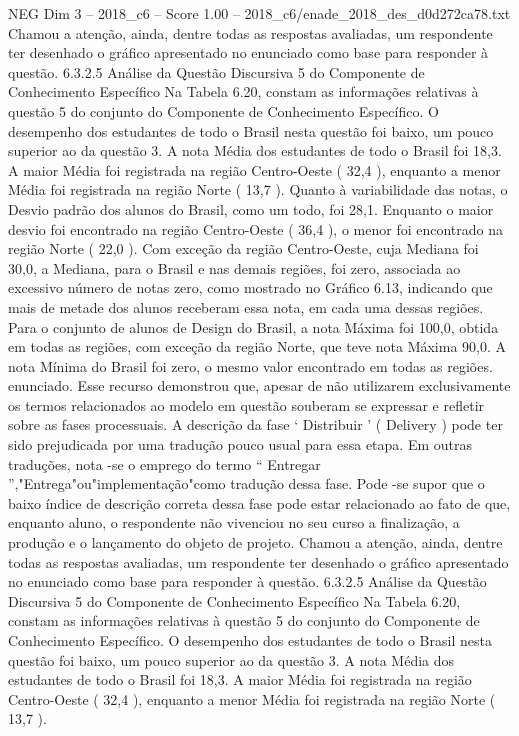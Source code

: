 \begin{textsample}{NEG Dim 3 – 2018\_c6 – Score 1.00 – 2018\_c6/enade\_2018\_des\_d0d272ca78.txt}
Chamou a atenção, ainda, dentre todas as respostas avaliadas, um respondente ter desenhado o gráfico apresentado no enunciado como base para responder à questão. 6.3.2.5 Análise da Questão Discursiva 5 do Componente de Conhecimento Específico Na Tabela 6.20, constam as informações relativas à questão 5 do conjunto do Componente de Conhecimento Específico.
O desempenho dos estudantes de todo o Brasil nesta questão foi baixo, um pouco superior ao da questão 3.
A nota Média dos estudantes de todo o Brasil foi 18,3.
A maior Média foi registrada na região Centro-Oeste ( 32,4 ), enquanto a menor Média foi registrada na região Norte ( 13,7 ).
Quanto à variabilidade das notas, o Desvio padrão dos alunos do Brasil, como um todo, foi 28,1.
Enquanto o maior desvio foi encontrado na região Centro-Oeste ( 36,4 ), o menor foi encontrado na região Norte ( 22,0 ).
Com exceção da região Centro-Oeste, cuja Mediana foi 30,0, a Mediana, para o Brasil e nas demais regiões, foi zero, associada ao excessivo número de notas zero, como mostrado no Gráfico 6.13, indicando que mais de metade dos alunos receberam essa nota, em cada uma dessas regiões.
Para o conjunto de alunos de Design do Brasil, a nota Máxima foi 100,0, obtida em todas as regiões, com exceção da região Norte, que teve nota Máxima 90,0.
A nota Mínima do Brasil foi zero, o mesmo valor encontrado em todas as regiões. enunciado.
Esse recurso demonstrou que, apesar de não utilizarem exclusivamente os termos relacionados ao modelo em questão souberam se expressar e refletir sobre as fases processuais.
A descrição da fase ‘ Distribuir ’ ( Delivery ) pode ter sido prejudicada por uma tradução pouco usual para essa etapa.
Em outras traduções, nota -se o emprego do termo “ Entregar ”,"Entrega"ou"implementação"como tradução dessa fase.
Pode -se supor que o baixo índice de descrição correta dessa fase pode estar relacionado ao fato de que, enquanto aluno, o respondente não vivenciou no seu curso a finalização, a produção e o lançamento do objeto de projeto.
Chamou a atenção, ainda, dentre todas as respostas avaliadas, um respondente ter desenhado o gráfico apresentado no enunciado como base para responder à questão. 6.3.2.5 Análise da Questão Discursiva 5 do Componente de Conhecimento Específico Na Tabela 6.20, constam as informações relativas à questão 5 do conjunto do Componente de Conhecimento Específico.
O desempenho dos estudantes de todo o Brasil nesta questão foi baixo, um pouco superior ao da questão 3.
A nota Média dos estudantes de todo o Brasil foi 18,3.
A maior Média foi registrada na região Centro-Oeste ( 32,4 ), enquanto a menor Média foi registrada na região Norte ( 13,7 ).

\end{textsample}

